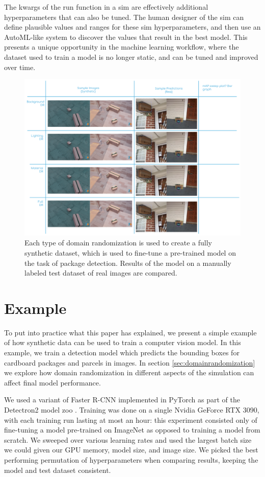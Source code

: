 \documentclass{article}
\begin{document}
The kwargs of the run function in a sim are effectively additional hyperparameters that can also be tuned. The human designer of the sim can define plausible values and ranges for these sim hyperparameters, and then use an AutoML-like system to discover the values that result in the best model. This presents a unique opportunity in the machine learning workflow, where the dataset used to train a model is no longer static, and can be tuned and improved over time.

\begin{figure}
	\centering
	\includegraphics[width=\textwidth]{results.png}
	\caption{Each type of domain randomization is used to create a fully synthetic dataset, which is used to fine-tune a pre-trained model on the task of package detection. Results of the model on a manually labeled test dataset of real images are compared.}
	\label{fig:results}
\end{figure}

\section{Example}
\label{sec:example}

To put into practice what this paper has explained, we present a simple example of how synthetic data can be used to train a computer vision model. In this example, we train a detection model which predicts the bounding boxes for cardboard packages and parcels in images. In section \ref{sec:domainrandomization} we explore how domain randomization in different aspects of the simulation can affect final model performance.

We used a variant of Faster R-CNN implemented in PyTorch as part of the Detectron2 model zoo \cite{wu2019detectron2}. Training was done on a single Nvidia GeForce RTX 3090, with each training run lasting at most an hour: this experiment consisted only of fine-tuning a model pre-trained on ImageNet as opposed to training a model from scratch. We sweeped over various learning rates and used the largest batch size we could given our GPU memory, model size, and image size. We picked the best performing permutation of hyperparameters when comparing results, keeping the model and test dataset consistent.
\end{document}
